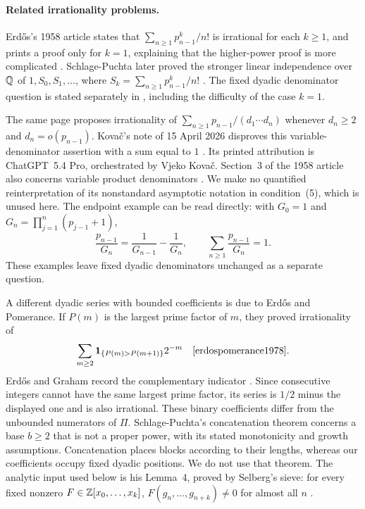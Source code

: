 \documentclass[11pt]{article}
\begin{document}
\paragraph{Related irrationality problems.}
Erd\H{o}s's 1958 article states that
$\sum_{n\ge1}p_{n-1}^k/n!$ is irrational for each $k\ge1$, and prints
a proof only for $k=1$, explaining that the higher-power proof is more
complicated \cite[pp.~93--95]{erdos1958}.
Schlage-Puchta later proved the stronger linear independence over $\mathbb{Q}$
of $1,S_0,S_1,\ldots$, where $S_k=\sum_{n\ge1}p_{n-1}^k/n!$
\cite[Theorem~3]{schlagepuchta2011}.
The fixed dyadic denominator question is stated separately in
\cite[p.~103]{erdos1988}, including the difficulty of the case $k=1$.

The same page proposes irrationality of
$\sum_{n\ge1}p_{n-1}/(d_1\cdots d_n)$ whenever $d_n\ge2$ and
$d_n=o(p_{n-1})$.  Kova\v{c}'s note of 15 April 2026 disproves this
variable-denominator assertion with a sum equal to $1$
\cite[Theorem~1 and proof, pp.~1--2]{kovac2026}.
Its printed attribution is ChatGPT~5.4 Pro, orchestrated by Vjeko Kova\v{c}.
Section~3 of the 1958 article also concerns variable product denominators
\cite[pp.~96--97]{erdos1958}.  We make no quantified reinterpretation
of its nonstandard asymptotic notation in condition~(5), which is unused
here.  The endpoint example can be read directly: with
$G_0=1$ and $G_n=\prod_{j=1}^n(p_{j-1}+1)$,
\[
 \frac{p_{n-1}}{G_n}=\frac1{G_{n-1}}-\frac1{G_n},\qquad
 \sum_{n\ge1}\frac{p_{n-1}}{G_n}=1.
\]
These examples leave fixed dyadic denominators unchanged as a separate
question.

A different dyadic series with bounded coefficients is due to Erd\H{o}s
and Pomerance.  If $P(m)$ is the largest prime factor of $m$, they proved
irrationality of
\[
 \sum_{m\ge2}\mathbf1_{\{P(m)>P(m+1)\}}2^{-m}
 \quad\text{\cite[\S7, p.~320]{erdospomerance1978}}.
\]
Erd\H{o}s and Graham record the complementary indicator
\cite[p.~62]{erdosgraham1980}.  Since consecutive integers cannot have
the same largest prime factor, its series is $1/2$ minus the displayed
one and is also irrational.  These binary coefficients differ from the
unbounded numerators of $\Pi$.
Schlage-Puchta's concatenation theorem
\cite[Theorem~2, p.~1]{schlagepuchta2011} concerns a base $b\ge2$ that
is not a proper power, with its stated monotonicity and growth assumptions.
Concatenation places blocks according to their lengths, whereas our
coefficients occupy fixed dyadic positions.  We do not use that theorem.
The analytic input used below is his Lemma~4, proved by Selberg's sieve:
for every fixed nonzero $F\in\mathbb{Z}[x_0,\ldots,x_k]$,
$F(g_n,\ldots,g_{n+k})\ne0$ for almost all $n$
\cite[Lemma~4, pp.~5--6]{schlagepuchta2011}.
\end{document}
